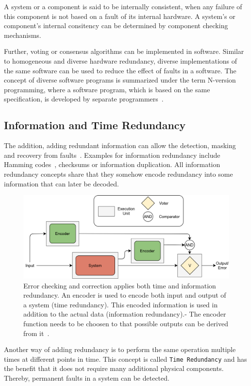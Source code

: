 \begin{definition}
A system or a component is said to be internally consistent, when any failure of this component is not based on a fault of its internal hardware.
A system's or component's internal consitency can be determined by component checking mechanisms.
\end{definition}

Further, voting or consensus algorithms can be implemented in software.
Similar to homogeneous and diverse hardware redundancy, diverse implementations of the same software can be used to reduce the effect of faults in a software.
The concept of diverse software programs is summarized under the term N-version programming, where a software program, which is based on the same specification, is developed by separate programmers~\cite{BarryFaultToleranceAnalysis}.

\subsection{Information and Time Redundancy}
The addition, adding redundant information can allow the detection, masking and recovery from faults~\cite{BarryFaultToleranceAnalysis}.
Examples for information redundancy include Hamming codes~\cite{HammingCodes}, checksums or information duplication.
All information redundancy concepts share that they somehow encode redundancy into some information that can later be decoded.

\begin{figure}[!hb]
	\centering
	\includegraphics[width=0.75\linewidth]{images/ECC}
	\caption{Error checking and correction applies both time and information redundancy. An encoder is used to encode both input and output of a system (time redundancy). This encoded information is used in addition to the actual data (information redundancy).- The encoder function needs to be choosen to that possible outputs can be derived from it~\cite{Su2005ECC}.}
	\label{fig:ECC}
\end{figure}

Another way of adding redundancy is to perform the same operation multiple times at different points in time.
This concept is called \texttt{Time Redundancy} and has the benefit that it does not require many additional physical components.
Thereby, permanent faults in a system can be detected.

